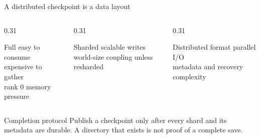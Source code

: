 \documentclass[handout]{beamer}
\begin{document}
\begin{frame}{A distributed checkpoint is a data layout}
  \begin{columns}[t]
    \begin{column}{0.31\linewidth}
      \begin{block}{Full}
        easy to consume\\expensive to gather\\rank 0 memory pressure
      \end{block}
    \end{column}
    \begin{column}{0.31\linewidth}
      \begin{block}{Sharded}
        scalable writes\\world-size coupling unless resharded
      \end{block}
    \end{column}
    \begin{column}{0.31\linewidth}
      \begin{block}{Distributed format}
        parallel I/O\\metadata and recovery complexity
      \end{block}
    \end{column}
  \end{columns}
  \begin{alertblock}{Completion protocol}
    Publish a checkpoint only after every shard and its metadata are durable. A directory that exists is not proof of a complete save.
  \end{alertblock}
\end{frame}
\end{document}
